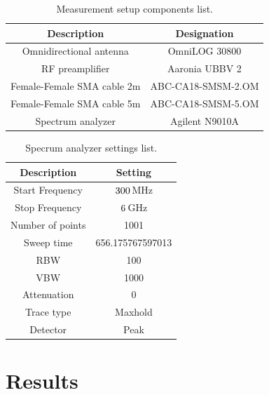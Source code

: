 \documentclass[12pt,a4paper,oneside]{article}
\begin{document}
\begin{table}[]
    \centering
   
    \begin{tabular}{|c|c|}
    \hline
         \cellcolor[gray]{0.85} Description & \cellcolor[gray]{0.85} Designation \\ \hline
         Omnidirectional antenna & OmniLOG 30800\\ \hline
         RF preamplifier & Aaronia UBBV 2\\ \hline
         Female-Female SMA cable 2m & ABC-CA18-SMSM-2.OM\\ \hline
         Female-Female SMA cable 5m & ABC-CA18-SMSM-5.OM\\ \hline
         Spectrum analyzer & Agilent N9010A\\ \hline
    \end{tabular}
    \caption{Measurement setup components list.}
    \label{tab:setup_component_list}
\end{table}

\begin{table}[]
    \centering
   
    \begin{tabular}{|c|c|}
    \hline
         \cellcolor[gray]{0.85} Description & \cellcolor[gray]{0.85} Setting \\ \hline
          Start Frequency & $300\thinspace$MHz \\ \hline
          Stop Frequency & $6\thinspace$GHz \\ \hline
          Number of points & 1001 \\ \hline
          Sweep time & 656.175767597013\\ \hline
          RBW & 100 \\ \hline
          VBW & 1000 \\ \hline
          Attenuation & 0 \\ \hline
          Trace type & Maxhold \\ \hline
          Detector & Peak \\ \hline         
    \end{tabular}
    \caption{Specrum analyzer settings list.}
    \label{tab:spectrum_analyzer_settings}
\end{table}
\section{Results}
\label{sec:Results}
\end{document}
